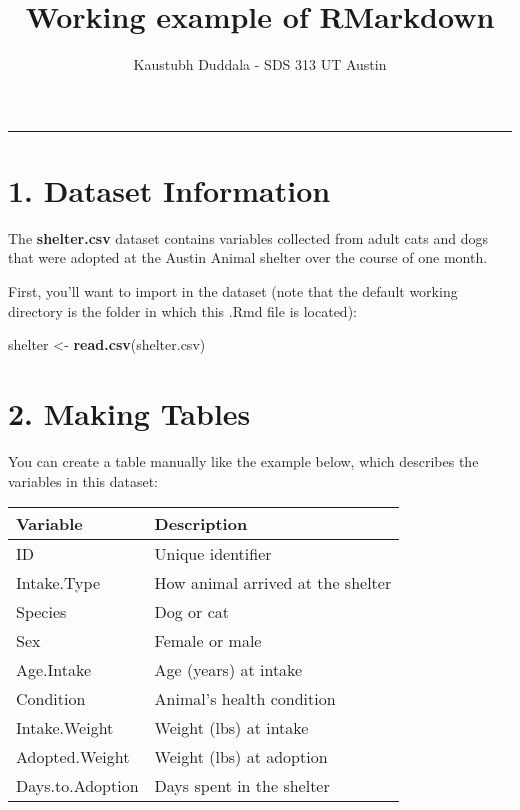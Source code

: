 \documentclass[
]{article}
\title{Working example of RMarkdown}
\author{Kaustubh Duddala - SDS 313 UT Austin}
\date{}
\newenvironment{Shaded}{\begin{snugshade}}{\end{snugshade}}
\newcommand{\FunctionTok}[1]{\textcolor[rgb]{0.13,0.29,0.53}{\textbf{#1}}}
\newcommand{\NormalTok}[1]{#1}
\newcommand{\OtherTok}[1]{\textcolor[rgb]{0.56,0.35,0.01}{#1}}
\newcommand{\StringTok}[1]{\textcolor[rgb]{0.31,0.60,0.02}{#1}}
\begin{document}
\maketitle

\begin{center}\rule{0.5\linewidth}{0.5pt}\end{center}

\section{\texorpdfstring{\textbf{1. Dataset
Information}}{1. Dataset Information}}\label{dataset-information}

The \textbf{shelter.csv} dataset contains variables collected from adult
cats and dogs that were adopted at the Austin Animal shelter over the
course of one month.

First, you'll want to import in the dataset (note that the default
working directory is the folder in which this .Rmd file is located):

\begin{Shaded}
\begin{Highlighting}[]
\NormalTok{shelter }\OtherTok{\textless{}{-}} \FunctionTok{read.csv}\NormalTok{(}\StringTok{\textquotesingle{}shelter.csv\textquotesingle{}}\NormalTok{)}
\end{Highlighting}
\end{Shaded}

\section{\texorpdfstring{\textbf{2. Making
Tables}}{2. Making Tables}}\label{making-tables}

You can create a table manually like the example below, which describes
the variables in this dataset:

\begin{longtable}[]{@{}ll@{}}
\toprule\noalign{}
Variable & Description \\
\midrule\noalign{}
\endhead
\bottomrule\noalign{}
\endlastfoot
ID & Unique identifier \\
Intake.Type & How animal arrived at the shelter \\
Species & Dog or cat \\
Sex & Female or male \\
Age.Intake & Age (years) at intake \\
Condition & Animal's health condition \\
Intake.Weight & Weight (lbs) at intake \\
Adopted.Weight & Weight (lbs) at adoption \\
Days.to.Adoption & Days spent in the shelter \\
\end{longtable}
\end{document}
